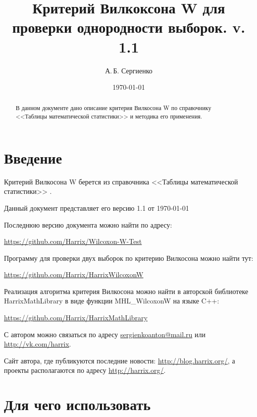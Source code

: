 \documentclass[a4paper,12pt]{article}
\title{Критерий Вилкоксона W для проверки однородности выборок. v. 1.1}
\author{А.\,Б. Сергиенко}
\date{\today}
\begin{document}


\maketitle

\begin{abstract}
В данном документе дано описание критерия Вилкосона W по справочнику <<Таблицы математической статистики>> \cite[с. 93]{book:Bolshev1983} и методика его применения.
\end{abstract}

\tableofcontents

\newpage

\section{Введение}

Критерий Вилкосона W берется из справочника <<Таблицы математической статистики>> \cite[с. 93]{book:Bolshev1983}.

Данный документ представляет его версию 1.1 от \today

Последнюю версию документа можно найти по адресу:

\href{https://github.com/Harrix/Wilcoxon-W-Test}{https://github.com/Harrix/Wilcoxon-W-Test}

Программу для проверки двух выборок по критерию Вилкосона можно найти тут:

\href{https://github.com/Harrix/HarrixWilcoxonW}{https://github.com/Harrix/HarrixWilcoxonW}

Реализация алгоритма критерия Вилкосона можно найти в авторской библиотеке HarrixMathLibrary в виде функции MHL\_WilcoxonW на языке C++:

\href{https://github.com/Harrix/HarrixMathLibrary}{https://github.com/Harrix/HarrixMathLibrary}

С автором можно связаться по адресу \href{mailto:sergienkoanton@mail.ru}{sergienkoanton@mail.ru} или  \href{http://vk.com/harrix}{http://vk.com/harrix}.

Сайт автора, где публикуются последние новости: \href{http://blog.harrix.org/}{http://blog.harrix.org/}, а проекты располагаются по адресу \href{http://harrix.org/}{http://harrix.org/}.

\section{Для чего использовать}
\end{document}
